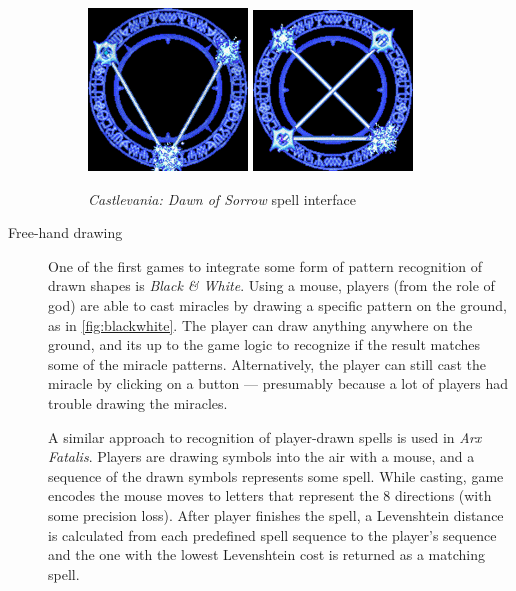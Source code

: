 \begin{description}
\begin{figure}
\centering
\includegraphics[width=.3\linewidth]{ext/castlevania.png}
\quad
\includegraphics[width=.3\linewidth]{ext/castlevania2.png}
\caption{\emph{Castlevania: Dawn of Sorrow} spell interface }
\label{fig:castlevania} %
\end{figure}

\item[Free-hand drawing]
One of the first games to integrate some form of pattern recognition of drawn shapes is \emph{Black \& White}. Using a mouse, players (from the role of god) are able to cast miracles by drawing a specific pattern on the ground, as in \cref{fig:blackwhite}. The player can draw anything anywhere on the ground, and its up to the game logic to recognize if the result matches some of the miracle patterns. Alternatively, the player can still cast the miracle by clicking on a button --- presumably because a lot of players had trouble drawing the miracles.

A similar approach to recognition of player-drawn spells is used in \emph{Arx Fatalis}. Players are drawing symbols into the air with a mouse, and a sequence of the drawn symbols represents some spell. While casting, game encodes the mouse moves to letters that represent the 8 directions (with some precision loss). After player finishes the spell, a Levenshtein distance is calculated from each predefined spell sequence to the player's sequence and the one with the lowest Levenshtein cost is returned as a matching spell.


\end{description}
